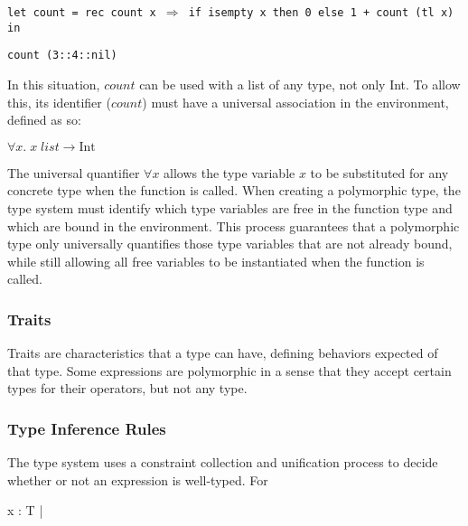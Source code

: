 \documentclass{article}
\def\code#1{\begin{footnotesize}\texttt{#1}\end{footnotesize}}
\begin{document}
\smallskip

\code{let count = rec count x $\Rightarrow$ if isempty x then 0 else 1 + count (tl x) in}

\code{count (3::4::nil)}

\smallskip

In this situation, $count$ can be used with a list of any type, not only Int.
To allow this, its identifier ($count$) must have a universal association in the environment, defined as so:

\smallskip
$\forall x. \; x \; list \rightarrow \mbox{Int}$
\smallskip

The universal quantifier $\forall x$ allows the type variable $x$ to be substituted for any concrete type when the function is called.
When creating a polymorphic type, the type system must identify which type variables are free in the function type and which are bound in the environment.
This process guarantees that a polymorphic type only universally quantifies those type variables that are not already bound, while still allowing all free variables to be instantiated when the function is called.

\subsubsection{Traits}

Traits are characteristics that a type can have, defining behaviors expected of that type.
Some expressions are polymorphic in a sense that they accept certain types for their operators, but not any type.

\subsubsection{Type Inference Rules}

The type system uses a constraint collection and unification process to decide whether or not an expression is well-typed.
For 

    
    
    
    
    {\Gamma \vdash x : \mbox{T} \; | \; \left[\right]}
    
\end{document}
